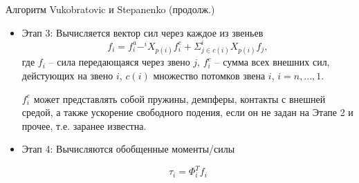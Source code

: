 \documentclass[newPxFont,numfooter,sectionpages]{beamer}
\begin{document}
\begin{frame}{Алгоритм Vukobratovic и Stepanenko (продолж.)}
	\begin{itemize}
		\item Этап 3:
		Вычисляется вектор сил через каждое из звеньев
		\begin{equation*}
		f_i = f^a_i - ^iX_{p(i)} f^e_i + \Sigma_{j \in c(i)} ^iX_{p(i)} f_j,
		\end{equation*}
		где $f_i$ -- сила передающаяся через звено $j$, $f^e_i$ -- сумма всех внешних сил, дейстующих на звено $i$, $c(i)$ множество потомков звена $i$, $i = n,...,1$.
		
		$f^e_i$ может представлять собой пружины, демпферы, контакты с внешней средой, а также ускорение свободного подения, если он не задан на Этапе 2 и прочее, т.е. заранее известна.
		
		\item Этап 4:
		Вычисляются обобщенные моменты/силы
		
		\begin{equation*}
		\tau_i = \Phi_i^T f_i
		\end{equation*}
	\end{itemize}
\end{frame}
\end{document}
